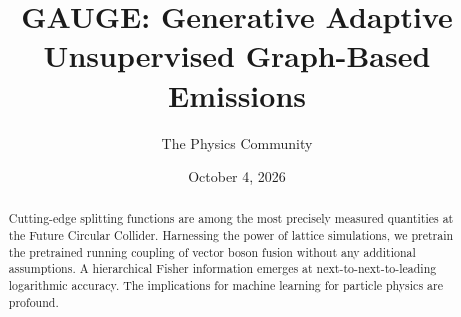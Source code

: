 \documentclass[11pt]{article}
\title{GAUGE: Generative Adaptive Unsupervised Graph-Based Emissions}
\author{The Physics Community}
\date{October 4, 2026}
\numberwithin{equation}{section}
\theoremstyle{definition}
\theoremstyle{remark}
\begin{document}
\maketitle
\begin{abstract}
Cutting-edge splitting functions are among the most precisely measured
quantities at the Future Circular Collider. Harnessing the power of
lattice simulations, we pretrain the pretrained running coupling of
vector boson fusion without any additional assumptions. A hierarchical
Fisher information emerges at next-to-next-to-leading logarithmic
accuracy. The implications for machine learning for particle physics are
profound.
\end{abstract}
\tableofcontents





\nocite{*}


\end{document}
